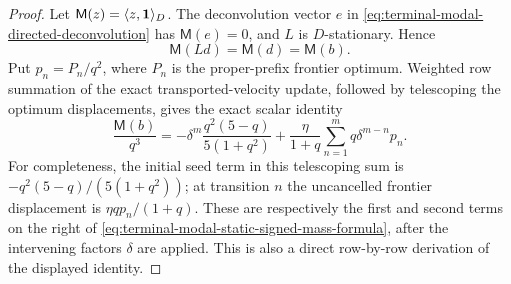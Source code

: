 \begin{proof}
Let $\mathsf M(z)=\langle z,\mathbf{1}\rangle_D$.  The deconvolution vector
$e$ in \eqref{eq:terminal-modal-directed-deconvolution} has
$\mathsf M(e)=0$, and $L$ is $D$-stationary.  Hence
\begin{equation}
 \mathsf M(Ld)=\mathsf M(d)=\mathsf M(b).
 \label{eq:terminal-modal-static-signed-mass-identity}
\end{equation}
Put $p_n=P_n/q^2$, where $P_n$ is the proper-prefix frontier optimum.
Weighted row summation of the exact transported-velocity update, followed by
telescoping the optimum displacements, gives the exact scalar identity
\begin{equation}
 \frac{\mathsf M(b)}{q^3}
 =-\delta^m\frac{q^2(5-q)}{5(1+q^2)}
  +\frac{\eta}{1+q}\sum_{n=1}^m
       q\delta^{m-n}p_n.
 \label{eq:terminal-modal-static-signed-mass-formula}
\end{equation}
For completeness, the initial seed term in this telescoping sum is
$-q^2(5-q)/(5(1+q^2))$; at transition $n$ the uncancelled frontier
displacement is $\eta q p_n/(1+q)$.  These are respectively the first and
second terms on the right of
\eqref{eq:terminal-modal-static-signed-mass-formula}, after the intervening
factors $\delta$ are applied.  This is also a direct row-by-row derivation of
the displayed identity.


\end{proof}
